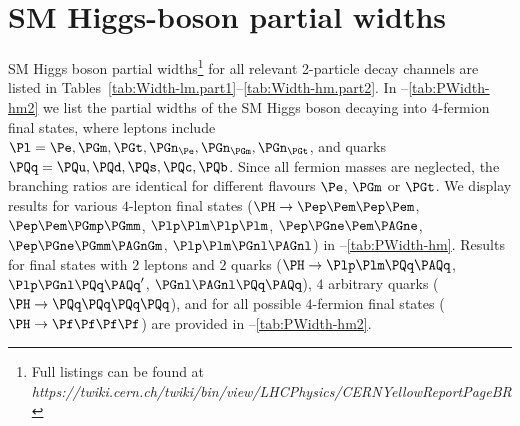 \clearpage

\section{SM Higgs-boson partial widths}
\label{brappendix}

SM Higgs boson partial widths\footnote{Full listings can be found at
  {\sl https://twiki.cern.ch/twiki/bin/view/LHCPhysics/CERNYellowReportPageBR}}
for all relevant 2-particle decay channels are listed in Tables~\ref{tab:Width-lm.part1}--\ref{tab:Width-hm.part2}.
In --\ref{tab:PWidth-hm2} we list the
partial widths of the SM Higgs boson decaying into $4$-fermion final
states,
where leptons include
$\Pl=\Pe,\PGm,\PGt,\PGn_{\Pe},\PGn_{\PGm},\PGn_{\PGt}$,
and quarks $\PQq=\PQu,\PQd,\PQs,\PQc,\PQb$.
Since all fermion masses are neglected, the branching ratios are
identical for different flavours $\Pe$, $\PGm$ or $\PGt$.
We display results for various $4$-lepton final states ($\PH \to
\Pep\Pem\Pep\Pem$,
$\Pep\Pem\PGmp\PGmm$,
$\Plp\Plm\Plp\Plm$,
$\Pep\PGne\Pem\PAGne$,
$\Pep\PGne\PGmm\PAGnGm$,
$\Plp\Plm\PGnl\PAGnl$)
in --\ref{tab:PWidth-hm}.
Results for final states with $2$ leptons
and $2$ quarks ($\PH \to \Plp\Plm\PQq\PAQq$,
$\Plp\PGnl\PQq\PAQq^{\prime}$, $\PGnl\PAGnl\PQq\PAQq$), 
$4$ arbitrary quarks ($\PH \to \PQq\PQq\PQq\PQq$),
and for all possible $4$-fermion final states ($\PH \to
\Pf\Pf\Pf\Pf$)
are provided in --\ref{tab:PWidth-hm2}.


